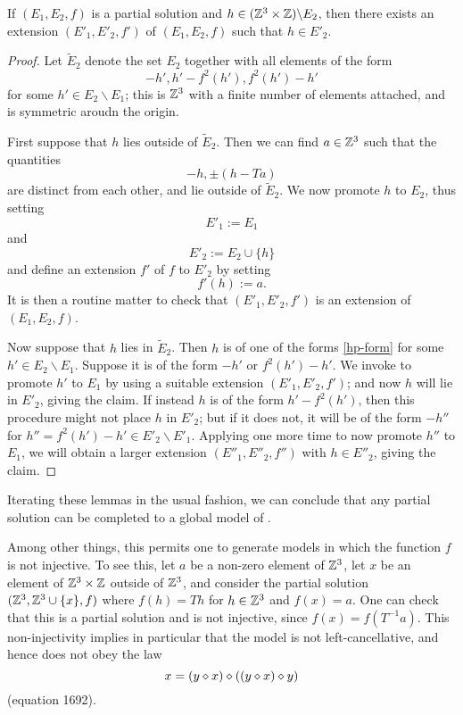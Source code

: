 \begin{lemma}[Promoting to $E_2$]\label{add-E2}  If $(E_1,E_2,f)$ is a partial solution and $h \in (\mathbb{Z}^3 \times \mathbb{Z}) \backslash E_2$, then there exists an extension $(E'_1,E'_2,f')$ of $(E_1,E_2,f)$ such that $h \in E'_2$.
\end{lemma}

\begin{proof}  Let $\tilde E_2$ denote the set $E_2$ together with all elements of the form
\begin{equation}\label{hp-form}
 -h', h' - f^2(h'), f^2(h') - h'
\end{equation}
for some $h' \in E_2 \backslash E_1$; this is $\mathbb{Z}^3$ with a finite number of elements attached, and is symmetric aroudn the origin.

First suppose that $h$ lies outside of $\tilde E_2$.  Then we can find $a \in \mathbb{Z}^3$ such that the quantities
$$ -h, \pm (h - Ta)$$
are distinct from each other, and lie outside of $\tilde E_2$.  We now promote $h$ to $E_2$, thus setting
$$ E'_1 := E_1$$
and
$$ E'_2 := E_2 \cup \{h\}$$
and define an extension $f'$ of $f$ to $E'_2$ by setting
$$ f'(h) := a.$$
It is then a routine matter to check that $(E'_1,E'_2,f')$ is an extension of $(E_1,E_2,f)$.

Now suppose that $h$ lies in $\tilde E_2$.  Then $h$ is of one of the forms \eqref{hp-form} for some $h' \in E_2 \backslash E_1$.  Suppose it is of the form $-h'$ or $f^2(h') - h'$.  We invoke  to promote $h'$ to $E_1$ by using a suitable extension $(E'_1,E'_2,f')$; and now $h$ will lie in $E'_2$, giving the claim.  If instead $h$ is of the form $h'-f^2(h')$, then this procedure might not place $h$ in $E'_2$; but if it does not, it will be of the form $-h''$ for $h'' = f^2(h')-h' \in E'_2 \backslash E'_1$.  Applying  one more time to now promote $h''$ to $E_1$, we will obtain a larger extension $(E''_1,E''_2,f'')$ with $h \in E''_2$, giving the claim.
\end{proof}

Iterating these lemmas in the usual fashion, we can conclude that any partial solution can be completed to a global model of .

Among other things, this permits one to generate models in which the function $f$ is not injective.  To see this, let $a$ be a non-zero element of $\mathbb{Z}^3$, let $x$ be an element of $\mathbb{Z}^3 \times \mathbb{Z}$ outside of $\mathbb{Z}^3$, and consider the partial solution $(\mathbb{Z}^3, \mathbb{Z}^3 \cup \{x\}, f)$ where $f(h) = Th$ for $h \in \mathbb{Z}^3$ and $f(x) = a$.  One can check that this is a partial solution and is not injective, since $f(x) = f(T^{-1} a)$.  This non-injectivity implies in particular that the model is not left-cancellative, and hence does not obey the law
$$ x = (y \diamond x) \diamond ((y \diamond x) \diamond y)$$
(equation 1692).
